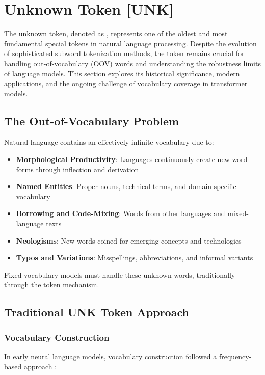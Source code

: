 \section{Unknown Token [UNK]}

The unknown token, denoted as \unk{}, represents one of the oldest and most fundamental special tokens in natural language processing. Despite the evolution of sophisticated subword tokenization methods, the \unk{} token remains crucial for handling out-of-vocabulary (OOV) words and understanding the robustness limits of language models. This section explores its historical significance, modern applications, and the ongoing challenge of vocabulary coverage in transformer models.

\subsection{The Out-of-Vocabulary Problem}

Natural language contains an effectively infinite vocabulary due to:

\begin{itemize}
\item \textbf{Morphological Productivity}: Languages continuously create new word forms through inflection and derivation
\item \textbf{Named Entities}: Proper nouns, technical terms, and domain-specific vocabulary
\item \textbf{Borrowing and Code-Mixing}: Words from other languages and mixed-language texts
\item \textbf{Neologisms}: New words coined for emerging concepts and technologies
\item \textbf{Typos and Variations}: Misspellings, abbreviations, and informal variants
\end{itemize}

Fixed-vocabulary models must handle these unknown words, traditionally through the \unk{} token mechanism.

\subsection{Traditional UNK Token Approach}

\subsubsection{Vocabulary Construction}
In early neural language models, vocabulary construction followed a frequency-based approach \citep{rogers2020primer}:

